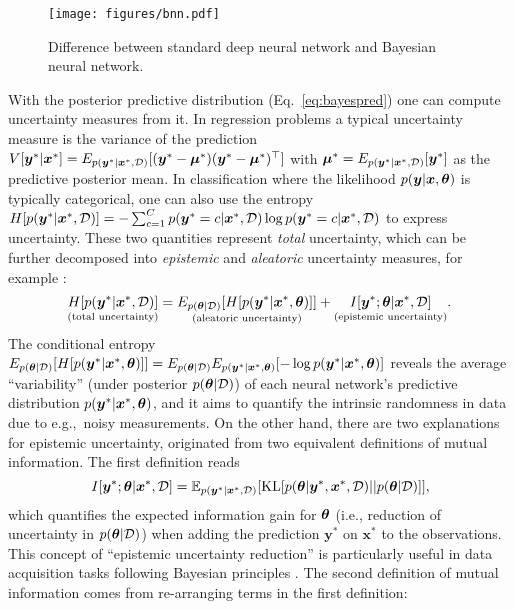 \begin{figure}[t]
    \centering
\texttt{[image: figures/bnn.pdf]}
    \caption{Difference between standard deep neural network and Bayesian neural network.}
    \label{fig: bnn}
    \vspace{-1em}
\end{figure}

With the posterior predictive distribution (Eq.~\eqref{eq:bayespred}) one can compute uncertainty measures from it. In regression problems a typical uncertainty measure is the variance of the prediction $V[\bm{y}^* | \bm{x}^*] = E_{p(\bm{y}^\ast|\bm{x}^\ast,\mathcal{D})}[(\bm{y}^* - \bm{\mu}^*)(\bm{y}^* - \bm{\mu}^*)^{\top}]$ with $\bm{\mu}^* = E_{p(\bm{y}^\ast|\bm{x}^\ast,\mathcal{D})}[\bm{y}^*]$ as the predictive posterior mean. In classification where the likelihood $p(\bm{y} | \bm{x}, \bm{\theta})$ is typically categorical, one can also use the entropy $H[p(\bm{y}^\ast|\bm{x}^\ast,\mathcal{D})] = -\sum_{c=1}^C p(\bm{y}^\ast = c |\bm{x}^\ast,\mathcal{D}) \log p(\bm{y}^\ast = c |\bm{x}^\ast,\mathcal{D})$ to express uncertainty. These two quantities represent \emph{total} uncertainty, which can be further decomposed into \emph{epistemic} and \emph{aleatoric} uncertainty measures, for example \citep{houlsby2011bayesian,gal2016thesis}:
\begin{equation}
    \underset{(\text{total uncertainty})}{H[p(\bm{y}^\ast|\bm{x}^\ast,\mathcal{D})]} = \underset{(\text{aleatoric uncertainty})}{E_{p(\bm{\theta} | \mathcal{D})}[H[p(\bm{y}^\ast|\bm{x}^\ast,\bm{\theta})]]} + \underset{(\text{epistemic uncertainty})}{I[\bm{y}^*; \bm{\theta} | \bm{x}^*, \mathcal{D}]}.
\label{eq:total_uncertainty}
\end{equation}
The conditional entropy $E_{p(\bm{\theta} | \mathcal{D})}[H[p(\bm{y}^\ast|\bm{x}^\ast,\bm{\theta})]] = E_{p(\bm{\theta} | \mathcal{D})} E_{p(\bm{y}^\ast|\bm{x}^\ast,\bm{\theta})}[-\log p(\bm{y}^\ast|\bm{x}^\ast,\bm{\theta})]$ reveals the average ``variability'' (under posterior $p(\bm{\theta} | \mathcal{D})$) of each neural network's predictive distribution $p(\bm{y}^* | \bm{x}^*, \bm{\theta})$, and it aims to quantify the intrinsic randomness in data due to e.g.,~noisy measurements.
%
On the other hand, there are two explanations for epistemic uncertainty, originated from two equivalent definitions of mutual information. 
%
The first definition reads
\[I[\bm{y}^*; \bm{\theta} | \bm{x}^*, \mathcal{D}] = \mathbb{E}_{p(\bm{y}^* | \bm{x}^*, \mathcal{D})} [\mathrm{KL}[ p(\bm{\theta} | \bm{y}^*, \bm{x}^*, \mathcal{D}) || p(\bm{\theta} | \mathcal{D})]], \]
%
which quantifies the expected information gain for $\bm{\theta}$ (i.e., reduction of uncertainty in $p(\bm{\theta} | \mathcal{D})$) when adding the prediction $\bm{y}^*$ on $\bm{x}^*$ to the observations. This concept of ``epistemic uncertainty reduction'' is particularly useful in data acquisition tasks following Bayesian principles \citep{houlsby2011bayesian}. The second definition of mutual information comes from re-arranging terms in the first definition:
